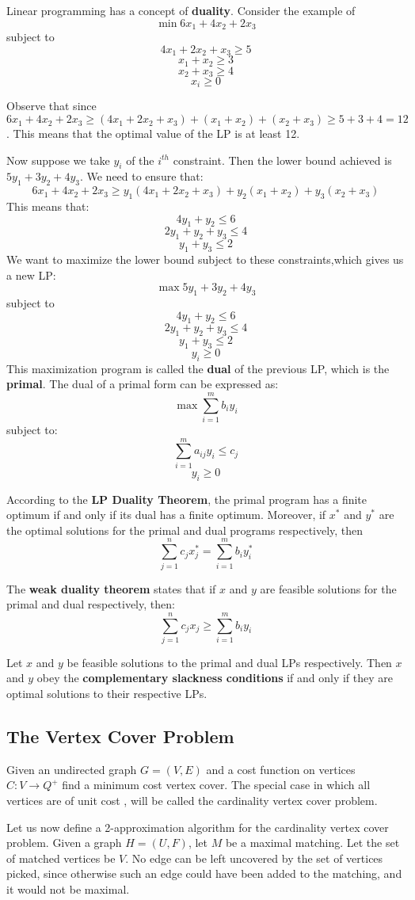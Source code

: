 \documentclass[12pt,letterpaper]{article}
\theoremstyle{definition}
\begin{document}
Linear programming has a concept of \textbf{duality}.  Consider the example of
\[\min 6x_1 + 4x_2 + 2x_3\]
subject to
\[4x_1 + 2x_2 + x_3 \geq 5\]
\[x_1 + x_2 \geq 3\]
\[x_2 + x_3 \geq 4\]
\[x_i \geq 0\]

Observe that since $6x_1 + 4x_2 + 2x_3 \geq (4x_1 + 2x_2 + x_3)  + (x_1 + x_2) + (x_2 + x_3) \geq 5+3+4 = 12$. This means that the optimal value of the LP is at least 12.

Now suppose we take $y_i$ of the $i^{th}$ constraint. Then the lower bound achieved is $5y_1 + 3y_2 + 4y_3$. We need to ensure that:
\[6x_1 + 4x_2 + 2x_3 \geq y_1(4x_1 + 2x_2 + x_3) + y_2(x_1 + x_2) + y_3(x_2+x_3)\]
This means that:
\[4y_1 + y_2 \leq 6\]
\[2y_1 + y_2 + y_3 \leq 4\]
\[y_1 + y_3 \leq 2\]
We want to maximize the lower bound subject to these constraints,which gives us a new LP:
\[\max 5y_1 + 3y_2 + 4y_3\]
subject to
\[4y_1 + y_2 \leq 6\]
\[2y_1 + y_2 + y_3 \leq 4\]
\[y_1 + y_3 \leq 2\]
\[y_i \geq 0\]
This maximization program is called the \textbf{dual}  of the previous LP, which is the \textbf{primal}. The dual of a primal form can be expressed as:
\[\max \sum_{i=1}^m b_i y_i\]
subject to:
\[\sum_{i=1}^m a_{ij}y_i \leq c_j\]
\[y_i \geq 0\]

According to the \textbf{LP Duality Theorem}, the primal program has a finite optimum if and only if its dual has a finite optimum. Moreover, if $x^*$  and $y^*$ are the optimal solutions for the primal and dual programs respectively, then
\[\sum_{j=1}^n c_jx_j^* = \sum_{i=1}^m b_iy_i^*\]

The \textbf{weak duality theorem}  states that if $x$ and $y$ are feasible solutions for the primal and dual respectively, then:
\[\sum_{j=1}^n c_jx_j \geq \sum_{i=1}^m b_iy_i\]

Let $x$ and $y$ be feasible solutions to the primal and dual LPs respectively. Then $x$ and $y$ obey the \textbf{complementary slackness conditions}  if and only if they are optimal solutions to their respective LPs.

\subsection{The Vertex Cover Problem}

Given an undirected graph $G = (V,E)$ and a cost function on vertices $C:V \rightarrow Q^+$ find a minimum cost vertex cover. The special case in which all vertices are of unit cost , will be called the cardinality vertex cover problem.

Let us now define a 2-approximation algorithm for the cardinality vertex cover problem. Given a graph $H = (U,F)$, let $M$ be a maximal matching. Let the set of matched vertices be $V$. No edge can be left uncovered by the set of vertices picked, since otherwise such an edge could have been added to the matching, and it would not be maximal.
\end{document}
